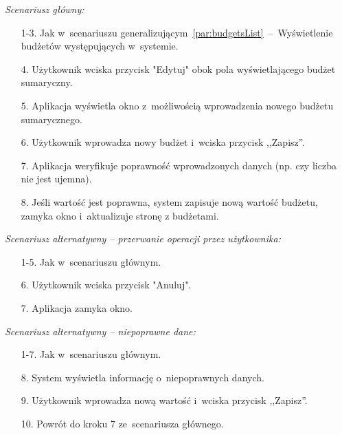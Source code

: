 \noindent \textit{Scenariusz główny:}
\begin{enumerate}
  \item[1-3.] Jak w~scenariuszu generalizującym~\ref{par:budgetsList}~--~Wyświetlenie budżetów występujących w~systemie.
  \item[4.] Użytkownik wciska przycisk "Edytuj" obok pola wyświetlającego budżet sumaryczny.
  \item[5.] Aplikacja wyświetla okno z~możliwością wprowadzenia nowego budżetu sumarycznego.
  \item[6.] Użytkownik wprowadza nowy budżet i~wciska przycisk ,,Zapisz''.
  \item[7.] Aplikacja weryfikuje poprawność wprowadzonych danych (np. czy liczba nie jest ujemna).
  \item[8.] Jeśli wartość jest poprawna, system zapisuje nową wartość budżetu, zamyka okno i~aktualizuje stronę z budżetami.
\end{enumerate}

\noindent \textit{Scenariusz alternatywny -- przerwanie operacji przez użytkownika:}
\begin{enumerate}
  \item[1-5.] Jak w~scenariuszu głównym.
  \item[6.] Użytkownik wciska przycisk "Anuluj".
  \item[7.] Aplikacja zamyka okno.
\end{enumerate}

\noindent \textit{Scenariusz alternatywny -- niepoprawne dane:}
\begin{enumerate}
  \item[1-7.] Jak w~scenariuszu głównym.
  \item[8.] System wyświetla informację o~niepoprawnych danych.
  \item[9.] Użytkownik wprowadza nową wartość i~wciska przycisk ,,Zapisz''.
  \item[10.] Powrót do kroku 7 ze~scenariusza głównego.
\end{enumerate}

